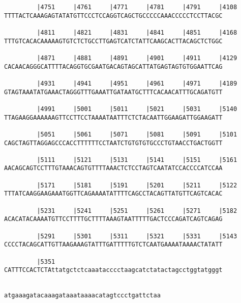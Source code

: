 \documentclass{article}
\begin{document}
\begin{Verbatim}
         |4751     |4761     |4771     |4781     |4791     |4108
TTTTACTCAAAGAGTATATGTTCCCTCCAGGTCAGCTGCCCCCAAACCCCCTCCTTACGC
                                                            
         |4811     |4821     |4831     |4841     |4851     |4168
TTTGTCACACAAAAAGTGTCTCTGCCTTGAGTCATCTATTCAAGCACTTACAGCTCTGGC
                                                            
         |4871     |4881     |4891     |4901     |4911     |4129
CACAACAGGGCATTTTACAGGTGCGAATGACAGTAGCATTATGAGTAGTGTGGAATTCAG
                                                            
         |4931     |4941     |4951     |4961     |4971     |4189
GTAGTAAATATGAAACTAGGGTTTGAAATTGATAATGCTTTCACAACATTTGCAGATGTT
                                                            
         |4991     |5001     |5011     |5021     |5031     |5140
TTAGAAGGAAAAAAGTTCCTTCCTAAAATAATTTCTCTACAATTGGAAGATTGGAAGATT
                                                            
         |5051     |5061     |5071     |5081     |5091     |5101
CAGCTAGTTAGGAGCCCACCTTTTTTCCTAATCTGTGTGTGCCCTGTAACCTGACTGGTT
                                                            
         |5111     |5121     |5131     |5141     |5151     |5161
AACAGCAGTCCTTTGTAAACAGTGTTTTAAACTCTCCTAGTCAATATCCACCCCATCCAA
                                                            
         |5171     |5181     |5191     |5201     |5211     |5122
TTTATCAAGGAAGAAATGGTTCAGAAAATATTTTCAGCCTACAGTTATGTTCAGTCACAC
                                                            
         |5231     |5241     |5251     |5261     |5271     |5182
ACACATACAAAATGTTCCTTTTGCTTTTAAAGTAATTTTTGACTCCCAGATCAGTCAGAG
                                                            
         |5291     |5301     |5311     |5321     |5331     |5143
CCCCTACAGCATTGTTAAGAAAGTATTTGATTTTTGTCTCAATGAAAATAAAACTATATT
                                                            
         |5351                                              
CATTTCCACTCTAttatgctctcaaatacccctaagcatctatactagcctggtatgggt
                                                            
                                           
atgaaagatacaaagataaataaaacatagtccctgattctaa
                                           
\end{Verbatim}
\end{document}

